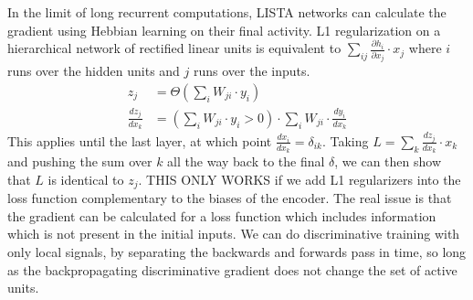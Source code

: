 \documentclass{article} %
\begin{document}
In the limit of long recurrent computations, LISTA networks can calculate the gradient using Hebbian learning on their final activity.
L1 regularization on a hierarchical network of rectified linear units is equivalent to $\sum_{ij} \frac{\partial h_i}{\partial x_j} \cdot x_j$ where $i$ runs over the hidden units and $j$ runs over the inputs.  
\begin{align*}
z_j &= \Theta\left(\sum_i W_{ji} \cdot y_i \right) \\
\frac{d z_j}{d x_k} &= \left( \sum_i W_{ji} \cdot y_i > 0 \right) \cdot \sum_i W_{ji} \cdot \frac{d y_i}{d x_k} 
\end{align*}
This applies until the last layer, at which point $\frac{d x_i}{d x_k} = \delta_{ik}$.  Taking $L = \sum_k \frac{d z_j}{d x_k} \cdot x_k$ and pushing the sum over $k$ all the way back to the final $\delta$, we can then show that $L$ is identical to $z_j$.  THIS ONLY WORKS if we add L1 regularizers into the loss function complementary to the biases of the encoder.  The real issue is that the gradient can be calculated for a loss function which includes information which is not present in the initial inputs.  We can do discriminative training with only local signals, by separating the backwards and forwards pass in time, so long as the backpropagating discriminative gradient does not change the set of active units.



\end{document}
